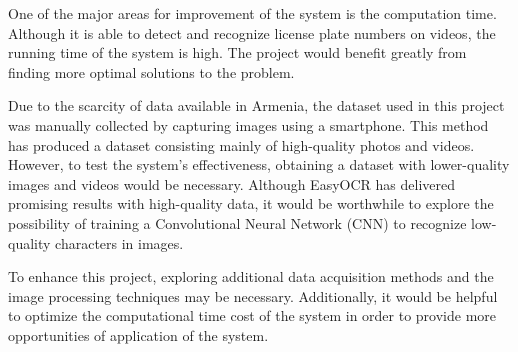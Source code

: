 \documentclass[conference]{IEEEtran}
\begin{document}
One of the major areas for improvement of the system is the computation time. Although it is able to detect and recognize license plate numbers on videos, the running time of the system is high. The project would benefit greatly from finding more optimal solutions to the problem.

Due to the scarcity of data available in Armenia, the dataset used in this project was manually collected by capturing images using a smartphone. This method has produced a dataset consisting mainly of high-quality photos and videos. However, to test the system's effectiveness, obtaining a dataset with lower-quality images and videos would be necessary. Although EasyOCR has delivered promising results with high-quality data, it would be worthwhile to explore the possibility of training a Convolutional Neural Network (CNN) to recognize low-quality characters in images.

To enhance this project, exploring additional data acquisition methods and the image processing techniques may be necessary. Additionally, it would be helpful to optimize the computational time cost of the system in order to provide more opportunities of application of the system.

\end{document}
